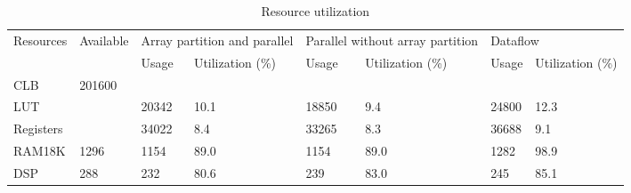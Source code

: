 \documentclass[conference]{IEEEtran}
\begin{document}
\begin{table*}[ht]
\caption{Resource utilization}
\centering
\begin{tabular}{| p{} | p{} | p{} | p{} | p{} | p{} | p{} | p{}|}
\hline
Resources & Available & \multicolumn{2}{|p{0.2\textwidth}|}{Array partition and parallel} & \multicolumn{2}{|p{0.2\textwidth}|}{Parallel without array partition} & \multicolumn{2}{|p{0.2\textwidth}|}{Dataflow} \\
\cline{3-8}
 & & Usage & Utilization (\%) & Usage & Utilization (\%) & Usage & Utilization (\%) \\
\hline
CLB & 201600 & & & & & &  \\
LUT & & 20342 & 10.1 & 18850 & 9.4 & 24800 & 12.3 \\
Registers & & 34022 & 8.4 & 33265 & 8.3 & 36688 & 9.1 \\
\hline
RAM18K & 1296 & 1154 & 89.0 & 1154 & 89.0 & 1282 & 98.9 \\
\hline
DSP & 288 & 232 & 80.6 & 239 & 83.0 & 245 & 85.1 \\
\hline
\end{tabular}

\end{table*}
%
%

\end{document}
